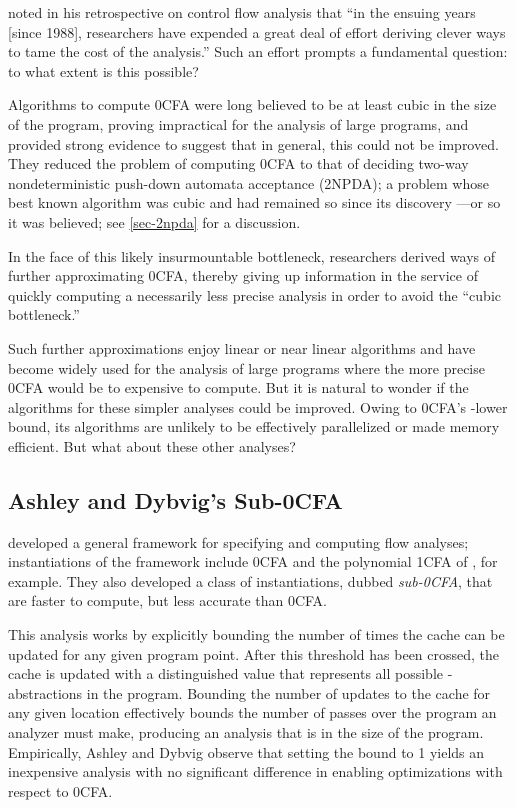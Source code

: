 \citet{shivers-sigplan04} noted in his retrospective on control flow
analysis that ``in the ensuing years [since 1988], researchers have
expended a great deal of effort deriving clever ways to tame the cost
of the analysis.''  Such an effort prompts a fundamental question: to
what extent is this possible?

Algorithms to compute 0CFA were long believed to be at least cubic in
the size of the program, proving impractical for the analysis of large
programs, and \citet{heintze-mcallester-lics97} provided strong
evidence to suggest that in general, this could not be improved.  They
reduced the problem of computing 0CFA to that of deciding two-way
nondeterministic push-down automata acceptance (2NPDA); a problem
whose best known algorithm was cubic and had remained so since its
discovery \cite{aho-hopcroft-ullman-ic68}---or so it was believed; see
\autoref{sec-2npda} for a discussion.

In the face of this likely insurmountable bottleneck, researchers
derived ways of further approximating 0CFA, thereby giving up
information in the service of quickly computing a necessarily less
precise analysis in order to avoid the ``cubic bottleneck.''

Such further approximations enjoy linear or near linear algorithms and
have become widely used for the analysis of large programs where the
more precise 0CFA would be to expensive to compute.  But it is natural
to wonder if the algorithms for these simpler analyses could be
improved.  Owing to 0CFA's \ptime-lower bound, its algorithms are
unlikely to be effectively parallelized or made memory efficient.  But
what about these other analyses?

\subsection{Ashley and Dybvig's Sub-0CFA}
\label{sec:sub0}

\citet{ashley-dybvig-toplas98} developed a general framework for
specifying and computing flow analyses; instantiations of the
framework include 0CFA and the polynomial 1CFA of
\citet{jagannathan-weeks-popl95}, for example.  They also developed a
class of instantiations, dubbed {\em sub-0CFA}, that are faster to
compute, but less accurate than 0CFA.

This analysis works by explicitly bounding the number of times the
cache can be updated for any given program point.  After this
threshold has been crossed, the cache is updated with a distinguished
 value that represents all possible -abstractions
in the program.  Bounding the number of updates to the cache for any
given location effectively bounds the number of passes over the
program an analyzer must make, producing an analysis that is  in
the size of the program.  Empirically, Ashley and Dybvig observe that
setting the bound to 1 yields an inexpensive analysis with no
significant difference in enabling optimizations with respect to 0CFA.


